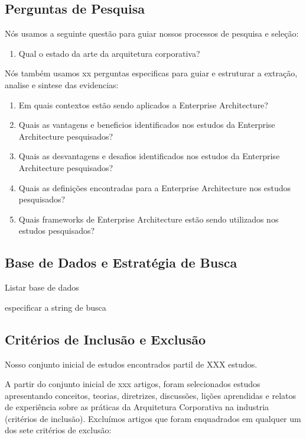 \subsection{Perguntas de Pesquisa}
Nós usamos a seguinte questão para guiar nossos processos de pesquisa e seleção:

\begin{enumerate}[start=0,label={R\arabic*):}]
    \item Qual o estado da arte da arquitetura corporativa?
\end{enumerate}

Nós também usamos xx perguntas especificas para guiar e estruturar a extração, analise e sintese das evidencias:

\begin{enumerate}[label={R\arabic*):}]
    \item Em quais contextos estão sendo aplicados a Enterprise Architecture?
    \item Quais as vantagens e beneficios identificados nos estudos da Enterprise Architecture pesquisados?
    \item Quais as desvantagens e desafios identificados nos estudos da Enterprise Architecture pesquisados?
    \item Quais as definições encontradas para a Enterprise Architecture nos estudos pesquisados?
    \item Quais frameworks de Enterprise Architecture estão sendo utilizados nos estudos pesquisados?
\end{enumerate}

\subsection{Base de Dados e Estratégia de Busca}

Listar base de dados

especificar a string de busca

\subsection{Critérios de Inclusão e Exclusão}

Nosso conjunto inicial de estudos encontrados partil de XXX estudos. 

A partir do conjunto inicial de xxx artigos, foram selecionados estudos apresentando conceitos, teorias, diretrizes, discussões, lições aprendidas e relatos de experiência sobre as práticas da Arquitetura Corporativa na industria (critérios de inclusão). Excluímos artigos que foram enquadrados em qualquer um dos sete critérios de exclusão:

